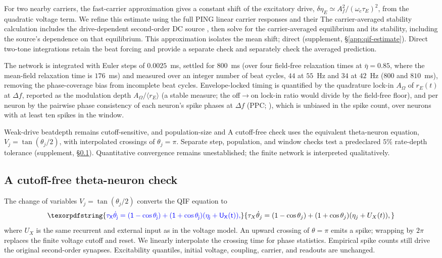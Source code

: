 \documentclass[11pt,a4paper]{article}
\newif\ifjne
\providecommand{\DIFaddtex}[1]{{\protect\color{blue} \sf #1}} %
\providecommand{\DIFdeltex}[1]{{\protect\color{red} \scriptsize #1}} %
\providecommand{\DIFaddbegin}{} %
\providecommand{\DIFaddend}{} %
\providecommand{\DIFdelbegin}{} %
\providecommand{\DIFdelend}{} %
\providecommand{\DIFadd}[1]{\texorpdfstring{\DIFaddtex{#1}}{#1}} %
\providecommand{\DIFdel}[1]{\texorpdfstring{\DIFdeltex{#1}}{}} %
\begin{document}
\DIFdelbegin \DIFdel{For two nearby carriers, the fast-carrier approximation gives a constant shift
of the excitatory drive, $\delta\eta_E\simeq A_f^2/(\omega_c\tau_E)^2$, from the
quadratic voltage term. We refine this estimate using the full PING linear carrier
responses and their }\DIFdelend \DIFaddbegin \DIFadd{The carrier-averaged stability calculation includes the drive-dependent
}\DIFaddend second-order DC source \DIFdelbegin \DIFdel{, then solve for the carrier-averaged
equilibrium and its stability, including the source's dependence on that equilibrium. This approximation isolates the mean shift; direct }\DIFdelend \DIFaddbegin \DIFadd{(supplement, \S\ref{app:qif-estimate}). Direct }\DIFaddend two-tone
integrations retain the beat \DIFdelbegin \DIFdel{forcing and provide a separate check }\DIFdelend \DIFaddbegin \DIFadd{and separately check the averaged prediction}\DIFaddend .

The network is integrated with Euler steps of $0.0025$~ms, settled for $800$~ms (over
four field-free relaxation times at $\bar\eta=0.85$, where the mean-field relaxation time is
$176$~ms) and measured over an integer number of beat cycles, $44$ at $55$~Hz and $34$ at
$42$~Hz ($800$ and $810$~ms), removing the phase-coverage bias from incomplete
beat cycles. Envelope-locked timing is quantified by the quadrature lock-in $A_\Omega$ of
$r_E(t)$ at $\Delta f$, reported as the modulation depth $A_\Omega/\langle r_E\rangle$ (a
stable measure; the off$\to$on lock-in ratio would divide by the field-free floor), and
per neuron by the pairwise phase consistency of each neuron's spike phases at $\Delta f$
(PPC; \cite{vinck2010}), which is unbiased in the spike count, over neurons with at least ten
spikes in the window.

\DIFdelbegin \DIFdel{Weak-drive beatdepth remains cutoff-sensitive, and population-size and }\DIFdelend \DIFaddbegin \DIFadd{A cutoff-free check uses the equivalent theta-neuron equation,
$V_j=\tan(\theta_j/2)$, with interpolated crossings of $\theta_j=\pi$.
Separate step, population, and window checks test a predeclared $5\%$
rate-depth tolerance (supplement, \S\ref{supp:theta-pilot}). Quantitative
convergence remains unestablished; the finite network is interpreted qualitatively.
}\ifjne\else
\subsection{\DIFadd{A cutoff-free theta-neuron check}}\label{supp:theta-pilot}
\DIFadd{The change of variables $V_j=\tan(\theta_j/2)$ converts the QIF equation to
}\[
\DIFadd{\tau_X\dot\theta_j=(1-\cos\theta_j)
 +(1+\cos\theta_j)(\eta_j+U_X(t)),
}\]
\DIFadd{where $U_X$ is the same recurrent and external input as in the voltage model.
An upward crossing of $\theta=\pi$ emits a spike; wrapping by $2\pi$ replaces
the finite voltage cutoff and reset. We linearly interpolate the crossing
time for phase statistics. Empirical spike counts still drive the original
second-order synapses. Excitability quantiles, initial voltage, coupling,
carrier, and readouts are unchanged.
}
\end{document}
